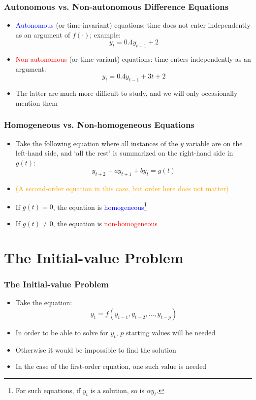 \documentclass[10pt,usenames,dvipsnames]{beamer}
\theoremstyle{definition}
\begin{document}
\begin{frame}[fragile]
\frametitle{Autonomous vs. Non-autonomous Difference Equations}
\begin{itemize}
	\item \textcolor{blue}{Autonomous} (or time-invariant) equations: time does not enter independently as an argument of $f(\cdot)$; example:
	\[
		y_{t} = 0.4y_{t-1} + 2
	\]
	\item \textcolor{red}{Non-autonomous} (or time-variant) equations: time enters independently as an argument:
	\[
		y_{t} = 0.4y_{t-1} + 3t + 2
	\]
	\item The latter are much more difficult to study, and we will only occasionally mention them
\end{itemize}
\end{frame}

\begin{frame}[fragile]
\frametitle{Homogeneous vs. Non-homogeneous Equations}
\begin{itemize}
	\item Take the following equation where all instances of the $y$ variable are on the left-hand side, and `all the rest' is summarized on the right-hand side in $g(t)$:
	\[
		y_{t+2} + ay_{t+1} + by_{t} = g(t)
	\]
	\item \textcolor{orange}{(A second-order equation in this case, but order here does not matter)}
	\item If $g(t) = 0$, the equation is \textcolor{blue}{homogeneous}\footnote{For such equations, if $y_{t}$ is a solution, so is $\alpha y_{t}$.}
	\item If $g(t) \neq 0$, the equation is \textcolor{red}{non-homogeneous}
\end{itemize}
\end{frame}

\section{The Initial-value Problem}
\begin{frame}[fragile]
\frametitle{The Initial-value Problem}
\begin{itemize}
	\item Take the equation:
	\[
		y_{t} = f(y_{t-1}, y_{t-2},\ldots,y_{t-p})
	\]
	\item In order to be able to solve for $y_{t}$, $p$ starting values will be needed
	\item Otherwise it would be impossible to find the solution
	\item In the case of the first-order equation, one such value is needed
\end{itemize}
\end{frame}
\end{document}
